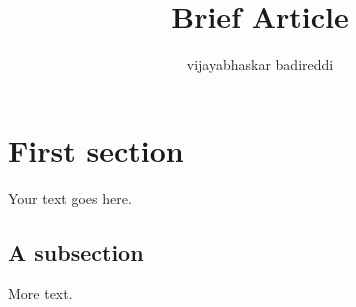 \documentclass[12pt]{article}
\title{Brief Article}
\author{vijayabhaskar badireddi}
\begin{document}
\maketitle

\section*{First section}

Your text goes here.

\subsection*{A subsection}

More text.
\end{document}
